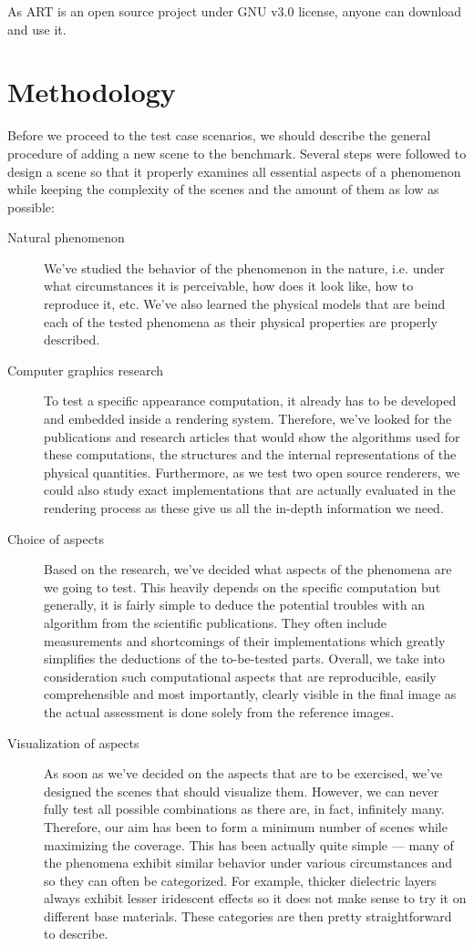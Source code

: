 As ART is an open source project under GNU v3.0 license, anyone can download and use it.

\section{Methodology}

Before we proceed to the test case scenarios, we should describe the general procedure of adding a new scene to the benchmark. Several steps were followed to design a scene so that it properly examines all essential aspects of a phenomenon while keeping the complexity of the scenes and the amount of them as low as possible:

\begin{description}
	\item[Natural phenomenon] We've studied the behavior of the phenomenon in the nature, i.e. under what circumstances it is perceivable, how does it look like, how to reproduce it, etc. We've also learned the physical models that are beind each of the tested phenomena as their physical properties are properly described.
	\item[Computer graphics research] To test a specific appearance computation, it already has to be developed and embedded inside a rendering system. Therefore, we've looked for the publications and research articles that would show the algorithms used for these computations, the structures and the internal representations of the physical quantities. Furthermore, as we test two open source renderers, we could also study exact implementations that are actually evaluated in the rendering process as these give us all the in-depth information we need.
	\item[Choice of aspects] Based on the research, we've decided what aspects of the phenomena are we going to test. This heavily depends on the specific computation but generally, it is fairly simple to deduce the potential troubles with an algorithm from the scientific publications. They often include measurements and shortcomings of their implementations which greatly simplifies the deductions of the to-be-tested parts. Overall, we take into consideration such computational aspects that are reproducible, easily comprehensible and most importantly, clearly visible in the final image as the actual assessment is done solely from the reference images. 
	\item[Visualization of aspects] As soon as we've decided on the aspects that are to be exercised, we've designed the scenes that should visualize them. However, we can never fully test all possible combinations as there are, in fact, infinitely many. Therefore, our aim has been to form a minimum number of scenes while maximizing the coverage. This has been actually quite simple --- many of the phenomena exhibit similar behavior under various circumstances and so they can often be categorized. For example, thicker dielectric layers always exhibit lesser iridescent effects so it does not make sense to try it on different base materials. These categories are then pretty straightforward to describe.

\end{description}
